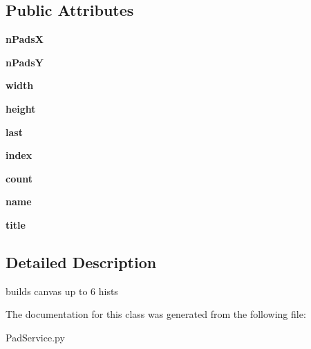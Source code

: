 \subsection*{Public Attributes}
\begin{CompactItemize}
\item 
\hypertarget{classtools_1_1PadService_1_1PadService_166437daa5e84fa12b931260cdadd5aa}{
\textbf{nPadsX}}
\label{classtools_1_1PadService_1_1PadService_166437daa5e84fa12b931260cdadd5aa}

\item 
\hypertarget{classtools_1_1PadService_1_1PadService_699b146575aa9184cdc43d4770461597}{
\textbf{nPadsY}}
\label{classtools_1_1PadService_1_1PadService_699b146575aa9184cdc43d4770461597}

\item 
\hypertarget{classtools_1_1PadService_1_1PadService_0c356b6b9df540ca9b4ef4892429b138}{
\textbf{width}}
\label{classtools_1_1PadService_1_1PadService_0c356b6b9df540ca9b4ef4892429b138}

\item 
\hypertarget{classtools_1_1PadService_1_1PadService_ae38b59241fa933587eda646096cbf84}{
\textbf{height}}
\label{classtools_1_1PadService_1_1PadService_ae38b59241fa933587eda646096cbf84}

\item 
\hypertarget{classtools_1_1PadService_1_1PadService_6afe4249db1b2c3a4ca4ec847b3cf15d}{
\textbf{last}}
\label{classtools_1_1PadService_1_1PadService_6afe4249db1b2c3a4ca4ec847b3cf15d}

\item 
\hypertarget{classtools_1_1PadService_1_1PadService_6d4eb6e42e6ce64cfcdc06b0ca813786}{
\textbf{index}}
\label{classtools_1_1PadService_1_1PadService_6d4eb6e42e6ce64cfcdc06b0ca813786}

\item 
\hypertarget{classtools_1_1PadService_1_1PadService_e804fe4aa16cd6234a2e85a85cd290ad}{
\textbf{count}}
\label{classtools_1_1PadService_1_1PadService_e804fe4aa16cd6234a2e85a85cd290ad}

\item 
\hypertarget{classtools_1_1PadService_1_1PadService_c0584edaec9da3268746adf851a7f6c3}{
\textbf{name}}
\label{classtools_1_1PadService_1_1PadService_c0584edaec9da3268746adf851a7f6c3}

\item 
\hypertarget{classtools_1_1PadService_1_1PadService_d68d6735dbba044c6406d99325adc839}{
\textbf{title}}
\label{classtools_1_1PadService_1_1PadService_d68d6735dbba044c6406d99325adc839}

\end{CompactItemize}


\subsection{Detailed Description}
builds canvas up to 6 hists 

The documentation for this class was generated from the following file:\begin{CompactItemize}
\item 
PadService.py\end{CompactItemize}
